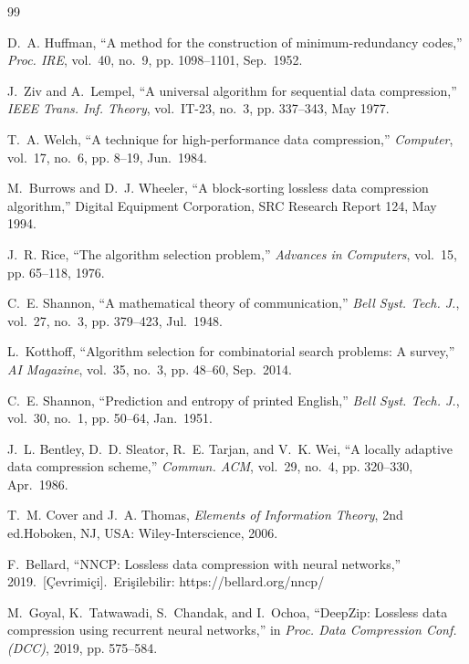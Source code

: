\documentclass[conference]{IEEEtran}
\begin{document}
\begin{thebibliography}{99}

D.~A. Huffman, ``A method for the construction of minimum-redundancy codes,'' \emph{Proc. IRE}, vol.~40, no.~9, pp. 1098--1101, Sep.\ 1952.

J.~Ziv and A.~Lempel, ``A universal algorithm for sequential data compression,'' \emph{IEEE Trans. Inf. Theory}, vol.~IT-23, no.~3, pp. 337--343, May 1977.

T.~A. Welch, ``A technique for high-performance data compression,'' \emph{Computer}, vol.~17, no.~6, pp. 8--19, Jun.\ 1984.

M.~Burrows and D.~J. Wheeler, ``A block-sorting lossless data compression algorithm,'' Digital Equipment Corporation, SRC Research Report 124, May 1994.

J.~R. Rice, ``The algorithm selection problem,'' \emph{Advances in Computers}, vol.~15, pp. 65--118, 1976.

C.~E. Shannon, ``A mathematical theory of communication,'' \emph{Bell Syst. Tech. J.}, vol.~27, no.~3, pp. 379--423, Jul.\ 1948.

L.~Kotthoff, ``Algorithm selection for combinatorial search problems: A survey,'' \emph{AI Magazine}, vol.~35, no.~3, pp. 48--60, Sep.\ 2014.

C.~E. Shannon, ``Prediction and entropy of printed English,'' \emph{Bell Syst. Tech. J.}, vol.~30, no.~1, pp. 50--64, Jan.\ 1951.

J.~L. Bentley, D.~D. Sleator, R.~E. Tarjan, and V.~K. Wei, ``A locally adaptive data compression scheme,'' \emph{Commun. ACM}, vol.~29, no.~4, pp. 320--330, Apr.\ 1986.

T.~M. Cover and J.~A. Thomas, \emph{Elements of Information Theory}, 2nd ed.\quad Hoboken, NJ, USA: Wiley-Interscience, 2006.

F.~Bellard, ``NNCP: Lossless data compression with neural networks,'' 2019.\ [Çevrimiçi].\ Erişilebilir: https://bellard.org/nncp/

M.~Goyal, K.~Tatwawadi, S.~Chandak, and I.~Ochoa, ``DeepZip: Lossless data compression using recurrent neural networks,'' in \emph{Proc. Data Compression Conf. (DCC)}, 2019, pp. 575--584.


\end{thebibliography}
\end{document}
